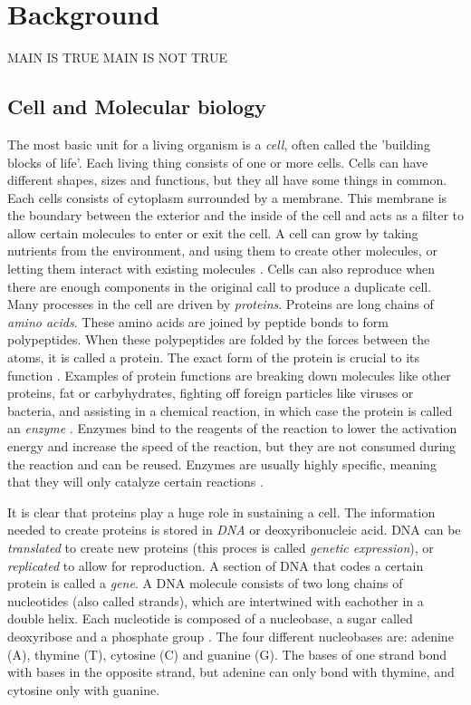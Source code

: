 \documentclass[../main/thesis.tex]{subfiles}
\begin{document}
\chapter{Background}
\ifdefined\main
\acresetall
MAIN IS TRUE
\newcommand{\codePath}{../2_background/code/}
\newcommand{\figPath}{../2_background/figures/}
\else
MAIN IS NOT TRUE

\fi


\section{Cell and Molecular biology}
The most basic unit for a living organism is a \textit{cell}, often called the 'building blocks of life'.
Each living thing consists of one or more cells.
Cells can have different shapes, sizes and functions, but they all have some things in common.
Each cells consists of cytoplasm surrounded by a membrane.
This membrane is the boundary between the exterior and the inside of the cell and acts as a filter to allow certain molecules to enter or exit the cell.
A cell can grow by taking nutrients from the environment, and using them to create other molecules, or letting them interact with existing molecules \cite{bioinformatics}.
Cells can also reproduce when there are enough components in the original call to produce a duplicate cell.
Many processes in the cell are driven by \textit{proteins}.
Proteins are long chains of \textit{amino acids}.
These amino acids are joined by peptide bonds to form polypeptides.
When these polypeptides are folded by the forces between the atoms, it is called a protein.
The exact form of the protein is crucial to its function \cite{protein_misfolding}.
Examples of protein functions are breaking down molecules like other proteins, fat or carbyhydrates, fighting off foreign particles like viruses or bacteria, and assisting in a chemical reaction, in which case the protein is called an \textit{enzyme} \cite{protein_function}.
Enzymes bind to the reagents of the reaction to lower the activation energy and increase the speed of the reaction, but they are not consumed during the reaction and can be reused.
Enzymes are usually highly specific, meaning that they will only catalyze certain reactions \cite{enzyme_specificity1}\cite{enzyme_specificity2}.

It is clear that proteins play a huge role in sustaining a cell.
The information needed to create proteins is stored in \textit{DNA} or deoxyribonucleic acid.
DNA can be \textit{translated} to create new proteins (this proces is called \textit{genetic expression}), or \textit{replicated} to allow for reproduction.
A section of DNA that codes a certain protein is called a \textit{gene}.
A DNA molecule consists of two long chains of nucleotides (also called strands), which are intertwined with eachother in a double helix.
Each nucleotide is composed of a nucleobase, a sugar called deoxyribose and a phosphate group \cite{dna_structure}.
The four different nucleobases are: adenine (A), thymine (T), cytosine (C) and guanine (G).
The bases of one strand bond with bases in the opposite strand, but adenine can only bond with thymine, and cytosine only with guanine.
\end{document}
